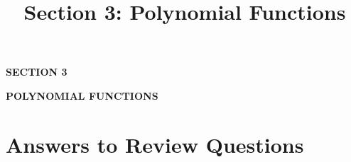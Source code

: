 \documentclass[11pt]{article}
\title{\textbf{Section 3: Polynomial Functions}}
\author{}
\date{}
\begin{document}
\begin{titlepage}
\centering
\vspace*{4cm}
{\Huge\bfseries\color{sectionblue} SECTION 3\par}
\vspace{1cm}
{\LARGE\bfseries POLYNOMIAL FUNCTIONS\par}
\end{titlepage}











\clearpage
\section*{Answers to Review Questions}

\end{document}
